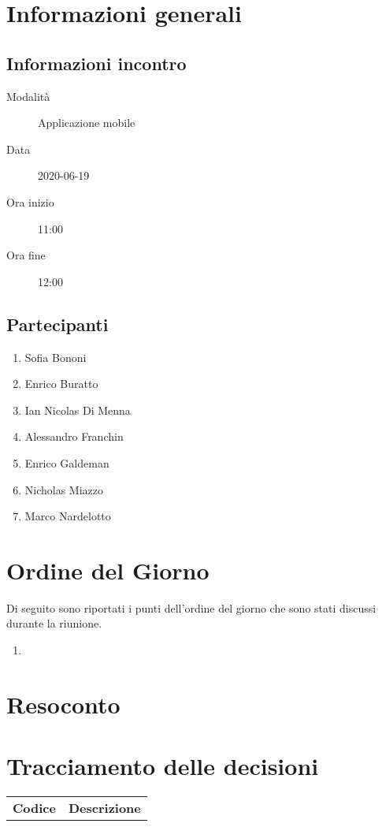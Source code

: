 \documentclass{article}
\begin{document}


\section{Informazioni generali}%
\label{sec:informazioni_generali}

\subsection{Informazioni incontro}%
\label{sub:informazioni_incontro}

\begin{description}
  \item[Modalità] Applicazione mobile 
  \item[Data] 2020-06-19
  \item[Ora inizio] 11:00
  \item[Ora fine] 12:00
\end{description}

\subsection{Partecipanti}%
\label{sub:partecipanti}

\begin{enumerate}
  \item Sofia Bononi
  \item Enrico Buratto
  \item Ian Nicolas Di Menna
  \item Alessandro Franchin
  \item Enrico Galdeman
  \item Nicholas Miazzo
  \item Marco Nardelotto
\end{enumerate}

\section{Ordine del Giorno}%
\label{ordine_del_giorno}
Di seguito sono riportati i punti dell'ordine del giorno che sono stati discussi durante la riunione.
\begin{enumerate}
  \item 
\end{enumerate}

\section{Resoconto}%
\label{resoconto}


\section{Tracciamento delle decisioni}
\begin{table}[H]
  \centering
  \begin{tabular}{p{4cm}|p{12cm}}
    \rowcolor{lightgray}
    \textbf{Codice}  & \textbf{Descrizione}      \\
  \end{tabular}
\end{table}
\end{document}
